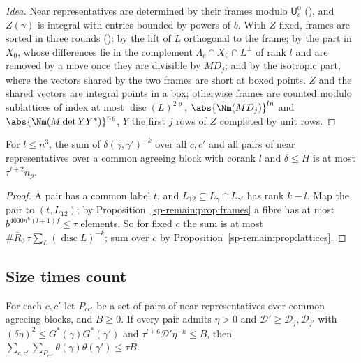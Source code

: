 \begin{proof}[Idea]
Near representatives are determined by their frames modulo $\mathsf U^0_c$
(), and $Z(\gamma)$ is integral with entries
bounded by powers of $b$. With $Z$ fixed, frames are sorted in three rounds
(): by the lift of $L$ orthogonal to the frame;
by the part in $X_0$, whose differences lie in the complement $\Lambda_c\cap X_0\cap L^\perp$ of rank
$l$ and are removed by a move once they are divisible by $MD_j$; and by the isotropic part, where the
vectors shared by the two frames are short at boxed points. $Z$ and the shared vectors are integral
points in a box; otherwise frames are counted modulo sublattices of index at most
$\operatorname{disc}(L)^{2\varrho}$, $\abs{\Nm(MD_j)}^{ln}$ and $\abs{\Nm(M\det YY^*)}^{n\varrho}$, $Y$ the
first $j$ rows of $Z$ completed by unit rows.
\end{proof}

\begin{theorem}\label{sp-remain:thm:count}
For $l\le n^3$, the sum of $\delta(\gamma,\gamma')^{-k}$ over all $c,c'$ and all pairs of near
representatives over a common agreeing block with corank $l$ and $\delta\le H$ is at most
$\tau^{l+2}n_p$.
\end{theorem}

\begin{proof}
A pair has a common label $t$, and $L_{12}\subseteq L_\gamma\cap L_{\gamma'}$ has rank $k-l$. Map the
pair to $(t,L_{12})$; by Proposition~\ref{sp-remain:prop:frames} a fibre has at most
$b^{4000n^6(l+1)f}\le\tau$ elements. So for fixed $c$ the sum is at most $\#\bar R_0\,\tau\sum_L
(\operatorname{disc}L)^{-k}$; sum over $c$ by Proposition~\ref{sp-remain:prop:lattices}.
\end{proof}

\subsection{Size times count}\label{sp-remain:ss:sum}

\begin{lemma}\label{sp-remain:lem:sum}
For each $c,c'$ let $P_{cc'}$ be a set of pairs of near representatives over common agreeing
blocks, and $B\ge0$. If every pair admits $\eta>0$ and $\mathcal D'\ge\mathcal D_j,\mathcal D_{j'}$ with $(\delta\eta)^2\le
G^*(\gamma)G^*(\gamma')$ and $\tau^{l+6}\mathcal D'\eta^{-k}\le B$, then $\sum_{c,c'}\sum_{P_{cc'}}
\theta(\gamma)\theta(\gamma')\le\tau B$.
\end{lemma}

